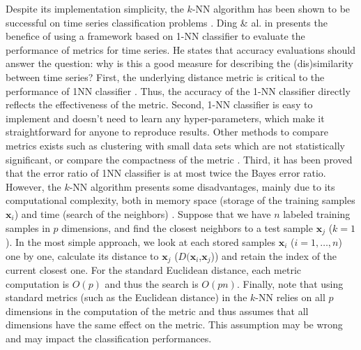 Despite its implementation simplicity, the $k$-NN algorithm has been shown to be successful on time series classification problems \cite{Belongie2002,Xi2006a,Ding2008}. Ding \& al. in \cite{Ding2008} presents the benefice of using a framework based on 1-NN classifier to evaluate the performance of metrics for time series. He states that accuracy evaluations should answer the question: why is this a good measure for describing the (dis)similarity between time series? First, the underlying distance metric is critical to the performance of 1NN classifier . Thus, the accuracy of the 1-NN classifier directly reflects the effectiveness of the metric. Second, 1-NN classifier is easy to implement and doesn't need to learn any hyper-parameters, which make it straightforward for anyone to reproduce results. Other methods to compare metrics exists such as clustering with small data sets which are not statistically significant, or compare the compactness of the metric . Third, it has been proved that the error ratio of 1NN classifier is at most twice the Bayes error ratio. \\
However, the $k$-NN algorithm presents some disadvantages, mainly due to its computational complexity, both in memory space (storage of the training samples $\textbf{x}_i$) and time (search of the neighbors) \cite{Duda1973}. Suppose that we have $n$ labeled training samples in $p$ dimensions, and find the closest neighbors to a test sample $\textbf{x}_j$ ($k = 1$). In the most simple approach, we look at each stored samples $\textbf{x}_i$ ($i=1,\ldots,n$) one by one, calculate its distance to $\textbf{x}_j$ ($D(\textbf{x}_i$,$\textbf{x}_j$)) and retain the index of the current closest one. For the standard Euclidean distance, each metric computation is $O(p)$ and thus the search is $O(pn)$. Finally, note that using standard metrics (such as the Euclidean distance) in the $k$-NN relies on all $p$ dimensions in the computation of the metric and thus assumes that all dimensions have the same effect on the metric. This assumption may be wrong and may impact the classification performances. \\
